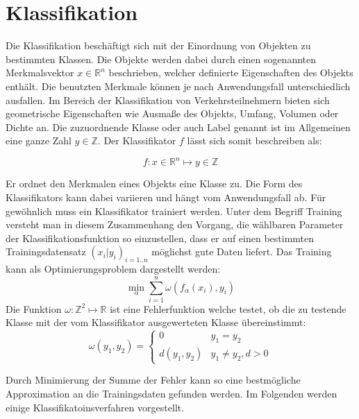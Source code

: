 \chapter{Klassifikation}

Die Klassifikation besch\"aftigt sich mit der Einordnung von Objekten zu bestimmten Klassen. Die Objekte werden dabei durch einen sogenannten Merkmalsvektor \( x \in \mathbb{R}^n \) beschrieben, welcher definierte Eigenschaften des Objekts enth\"alt. Die benutzten Merkmale k\"onnen je nach Anwendungsfall unterschiedlich ausfallen. Im Bereich der Klassifikation von Verkehrsteilnehmern bieten sich geometrische Eigenschaften wie Ausma\ss{}e des Objekts, Umfang, Volumen oder Dichte an. Die zuzuordnende Klasse oder auch Label genannt ist im Allgemeinen eine ganze Zahl \(y \in \mathbb{Z} \). Der Klassifikator \(f\) l\"asst sich somit beschreiben als:

\begin{equation*}
 f: x \in \mathbb{R}^n \mapsto y \in \mathbb{Z}
\end{equation*}

Er ordnet den Merkmalen eines Objekts eine Klasse zu. Die Form des Klassifikators kann dabei variieren und h\"angt vom Anwendungsfall ab.
F\"ur gew\"ohnlich muss ein Klassifikator trainiert werden. Unter dem Begriff Training versteht man in diesem Zusammenhang den Vorgang, die w\"ahlbaren Parameter der Klassifikationsfunktion so einzustellen, dass er auf einen bestimmten Trainingsdatensatz \( (x_i | y_i)_{i=1..n} \) m\"oglichst gute Daten liefert. Das Training kann als Optimierungsproblem dargestellt werden:
\begin{equation*}
 \min_{\alpha} \sum_{i=1}^n \omega ( f_{\alpha}(x_i), y_i)
\end{equation*}
Die Funktion \( \omega : \mathbb{Z}^2 \mapsto \mathbb{R} \) ist eine Fehlerfunktion welche testet, ob die zu testende Klasse mit der vom Klassifikator ausgewerteten Klasse \"ubereinstimmt:
\begin{equation*}
 \omega (y_1, y_2) = 
 \begin{cases}
  0 & y_1=y_2 \\
  d(y_1, y_2) & y_1 \neq y_2, d>0
 \end{cases}
\end{equation*}

Durch Minimierung der Summe der Fehler kann so eine bestm\"ogliche Approximation an die Trainingsdaten gefunden werden. Im Folgenden werden einige Klassifikatoinsverfahren vorgestellt.

